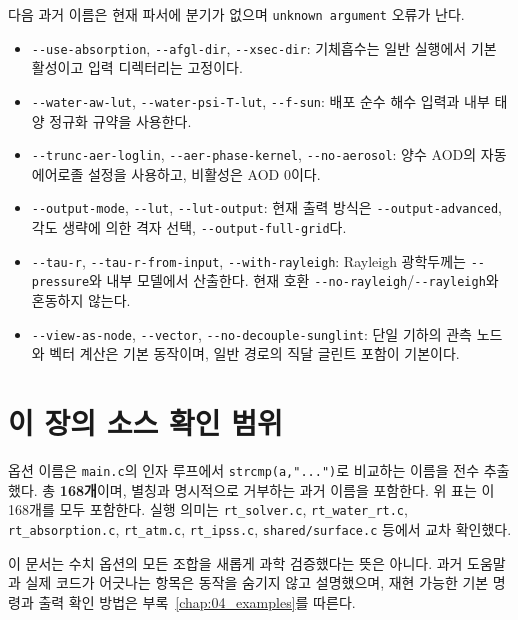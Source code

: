 다음 과거 이름은 현재 파서에 분기가 없으며 \texttt{unknown argument\allowbreak{}} 오류가 난다.

\begin{itemize}
\item \texttt{-\allowbreak{}-\allowbreak{}use-\allowbreak{}absorption}, \texttt{-\allowbreak{}-\allowbreak{}afgl-\allowbreak{}dir}, \texttt{-\allowbreak{}-\allowbreak{}xsec-\allowbreak{}dir}: 기체흡수는 일반 실행에서 기본 활성이고 입력 디렉터리는 고정이다.
\item \texttt{-\allowbreak{}-\allowbreak{}water-\allowbreak{}aw-\allowbreak{}lut}, \texttt{-\allowbreak{}-\allowbreak{}water-\allowbreak{}psi-\allowbreak{}T-\allowbreak{}lut}, \texttt{-\allowbreak{}-\allowbreak{}f-\allowbreak{}sun}: 배포 순수 해수 입력과 내부 태양 정규화 규약을 사용한다.
\item \texttt{-\allowbreak{}-\allowbreak{}trunc-\allowbreak{}aer-\allowbreak{}loglin}, \texttt{-\allowbreak{}-\allowbreak{}aer-\allowbreak{}phase-\allowbreak{}kernel}, \texttt{-\allowbreak{}-\allowbreak{}no-\allowbreak{}aerosol}: 양수 AOD의 자동 에어로졸 설정을 사용하고, 비활성은 AOD 0이다.
\item \texttt{-\allowbreak{}-\allowbreak{}output-\allowbreak{}mode}, \texttt{-\allowbreak{}-\allowbreak{}lut}, \texttt{-\allowbreak{}-\allowbreak{}lut-\allowbreak{}output}: 현재 출력 방식은 \texttt{-\allowbreak{}-\allowbreak{}output-\allowbreak{}advanced}, 각도 생략에 의한 격자 선택, \texttt{-\allowbreak{}-\allowbreak{}output-\allowbreak{}full-\allowbreak{}grid}다.
\item \texttt{-\allowbreak{}-\allowbreak{}tau-\allowbreak{}r}, \texttt{-\allowbreak{}-\allowbreak{}tau-\allowbreak{}r-\allowbreak{}from-\allowbreak{}input}, \texttt{-\allowbreak{}-\allowbreak{}with-\allowbreak{}rayleigh}: Rayleigh 광학두께는 \texttt{-\allowbreak{}-\allowbreak{}pressure}와 내부 모델에서 산출한다. 현재 호환 \texttt{-\allowbreak{}-\allowbreak{}no-\allowbreak{}rayleigh}/\texttt{-\allowbreak{}-\allowbreak{}rayleigh}와 혼동하지 않는다.
\item \texttt{-\allowbreak{}-\allowbreak{}view-\allowbreak{}as-\allowbreak{}node}, \texttt{-\allowbreak{}-\allowbreak{}vector}, \texttt{-\allowbreak{}-\allowbreak{}no-\allowbreak{}decouple-\allowbreak{}sunglint}: 단일 기하의 관측 노드와 벡터 계산은 기본 동작이며, 일반 경로의 직달 글린트 포함이 기본이다.
\end{itemize}

\section{이 장의 소스 확인 범위}
\label{sec:auto:03_options:12}
옵션 이름은 \texttt{main.\allowbreak{}c}의 인자 루프에서 \texttt{strcmp(a,\allowbreak{}".\allowbreak{}.\allowbreak{}.\allowbreak{}")}로 비교하는 이름을 전수 추출했다. 총 \textbf{168개}이며, 별칭과 명시적으로 거부하는 과거 이름을 포함한다. 위 표는 이 168개를 모두 포함한다. 실행 의미는 \texttt{rt\_\allowbreak{}solver.\allowbreak{}c}, \texttt{rt\_\allowbreak{}water\_\allowbreak{}rt.\allowbreak{}c}, \texttt{rt\_\allowbreak{}absorption.\allowbreak{}c}, \texttt{rt\_\allowbreak{}atm.\allowbreak{}c}, \texttt{rt\_\allowbreak{}ipss.\allowbreak{}c}, \texttt{shared/\allowbreak{}surface.\allowbreak{}c} 등에서 교차 확인했다.

이 문서는 수치 옵션의 모든 조합을 새롭게 과학 검증했다는 뜻은 아니다. 과거 도움말과 실제 코드가 어긋나는 항목은 동작을 숨기지 않고 설명했으며, 재현 가능한 기본 명령과 출력 확인 방법은 부록~\ref{chap:04_examples}를 따른다.


